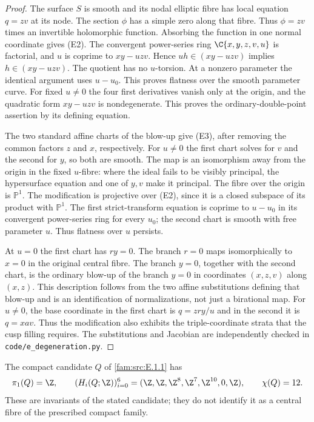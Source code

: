 \begin{proof}
The surface $S$ is smooth and its nodal elliptic fibre has local
equation $q=zv$ at its node. The section $\phi$ has a simple zero
along that fibre. Thus $\phi=zv$ times an invertible holomorphic
function. Absorbing the function in one normal coordinate gives (E2).
The convergent power-series ring $\C\{x,y,z,v,u\}$ is factorial,
and $u$ is coprime to $xy-uzv$. Hence $uh\in(xy-uzv)$ implies
$h\in(xy-uzv)$. The quotient has no $u$-torsion. At a nonzero
parameter the identical argument uses $u-u_0$. This proves flatness
over the smooth parameter curve.
For fixed $u\ne0$ the four first derivatives vanish only at the
origin, and the quadratic form $xy-uzv$ is nondegenerate. This proves
the ordinary-double-point assertion by its defining equation.

The two standard affine charts of the blow-up give (E3), after
removing the common factors $z$ and $x$, respectively. For $u\ne0$
the first chart solves for $v$ and the second for $y$, so both are
smooth. The map is an isomorphism away from the origin in the fixed
$u$-fibre: where the ideal fails to be visibly principal, the
hypersurface equation and one of $y,v$ make it principal. The fibre
over the origin is $\mathbb P^1$. The modification is projective
over (E2), since it is a closed subspace of its product with
$\mathbb P^1$. The first strict-transform equation is coprime to
$u-u_0$ in its convergent power-series ring for every $u_0$; the
second chart is smooth with free parameter $u$. Thus flatness over
$u$ persists.

At $u=0$ the first chart has $ry=0$. The branch $r=0$ maps
isomorphically to $x=0$ in the original central fibre. The branch
$y=0$, together with the second chart, is the ordinary blow-up of the
branch $y=0$ in coordinates $(x,z,v)$ along $(x,z)$. This description
follows from the two affine substitutions defining that blow-up and
is an identification of normalizations, not just a birational map.
For $u\ne0$, the base coordinate in the first chart is
$q=zry/u$ and in the second it is $q=xav$. Thus the modification also
exhibits the triple-coordinate strata that the cusp filling requires.
The substitutions and Jacobian are independently checked in
\texttt{code/e\_degeneration.py}.
\end{proof}

\begin{proposition}\label{fam:src:E.1.4}\label{fam:st:E.1.4}
The compact candidate $Q$ of \ref{fam:src:E.1.1} has
\[
 \pi_1(Q)=\Z,\qquad
 (H_i(Q;\Z))_{i=0}^6
   =(\Z,\Z,\Z^8,\Z^7,\Z^{10},0,\Z),\qquad\chi(Q)=12.
\]
These are invariants of the stated candidate; they do not identify it
as a central fibre of the prescribed compact family.
\end{proposition}


